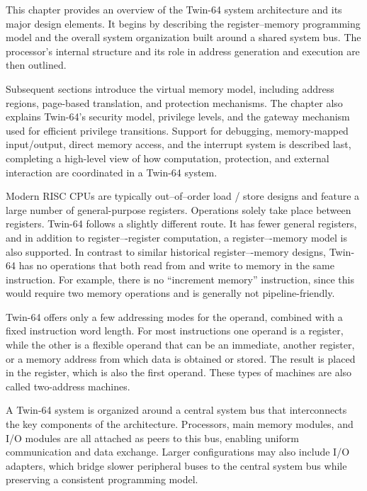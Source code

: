 
This chapter provides an overview of the Twin-64 system architecture and its major design elements. It begins by describing the register–memory programming model and the overall system organization built around a shared system bus. The processor’s internal structure and its role in address generation and execution are then outlined.

Subsequent sections introduce the virtual memory model, including address regions, page-based translation, and protection mechanisms. The chapter also explains Twin-64’s security model, privilege levels, and the gateway mechanism used for efficient privilege transitions. Support for debugging, memory-mapped input/output, direct memory access, and the interrupt system is described last, completing a high-level view of how computation, protection, and external interaction are coordinated in a Twin-64 system.



Modern RISC CPUs are typically out--of--order load / store designs and feature a large number of general-purpose registers. Operations solely take place between registers. Twin-64 follows a slightly different route. It has fewer general registers, and in addition to register–-register computation, a register–-memory model is also supported. In contrast to similar historical register–-memory designs, Twin-64 has no operations that both read from and write to memory in the same instruction. For example, there is no “increment memory” instruction, since this would require two memory operations and is generally not pipeline-friendly. 

Twin-64 offers only a few addressing modes for the operand, combined with a fixed instruction word length. For most instructions one operand is a register, while the other is a flexible operand that can be an immediate, another register, or a memory address from which data is obtained or stored. The result is placed in the register, which is also the first operand. These types of machines are also called two-address machines.


A Twin-64 system is organized around a central system bus that interconnects the key components of the architecture. Processors, main memory modules, and I/O modules are all attached as peers to this bus, enabling uniform communication and data exchange. Larger configurations may also include I/O adapters, which bridge slower peripheral buses to the central system bus while preserving a consistent programming model.

